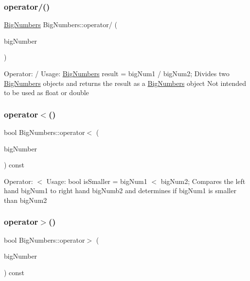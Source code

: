 \subsubsection{\texorpdfstring{operator/()}{operator/()}}
{\footnotesize\ttfamily \mbox{\hyperlink{class_big_numbers}{Big\+Numbers}} Big\+Numbers\+::operator/ (\begin{DoxyParamCaption}\item[{const \mbox{\hyperlink{class_big_numbers}{Big\+Numbers}} \&}]{big\+Number }\end{DoxyParamCaption})}

Operator\+: / Usage\+: \mbox{\hyperlink{class_big_numbers}{Big\+Numbers}} result = big\+Num1 / big\+Num2; Divides two \mbox{\hyperlink{class_big_numbers}{Big\+Numbers}} objects and returns the result as a \mbox{\hyperlink{class_big_numbers}{Big\+Numbers}} object Not intended to be used as float or double \mbox{\label{class_big_numbers_aed0d88ccd1ba6d7b1548c14a95de1b1a}} 
\subsubsection{\texorpdfstring{operator$<$()}{operator<()}}
{\footnotesize\ttfamily bool Big\+Numbers\+::operator$<$ (\begin{DoxyParamCaption}\item[{const \mbox{\hyperlink{class_big_numbers}{Big\+Numbers}} \&}]{big\+Number }\end{DoxyParamCaption}) const}

Operator\+: $<$ Usage\+: bool is\+Smaller = big\+Num1 $<$ big\+Num2; Compares the left hand big\+Num1 to right hand big\+Numb2 and determines if big\+Num1 is smaller than big\+Num2 \mbox{\label{class_big_numbers_a5fed3d1c9f239f4c57348953077eab77}} 
\subsubsection{\texorpdfstring{operator$>$()}{operator>()}}
{\footnotesize\ttfamily bool Big\+Numbers\+::operator$>$ (\begin{DoxyParamCaption}\item[{const \mbox{\hyperlink{class_big_numbers}{Big\+Numbers}} \&}]{big\+Number }\end{DoxyParamCaption}) const}

